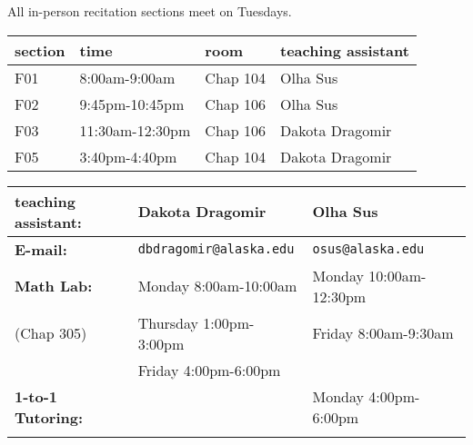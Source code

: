 \documentclass[11pt,fleqn]{article}
\begin{document}
All in-person recitation sections meet on Tuesdays.\\

\begin{center}
\vfill

\begin{tabular}{| l | l | l | l |}
\hline
section & time & room& teaching assistant \\
\hline \hline
F01&8:00am-9:00am&Chap 104& Olha Sus\\ \hline
F02&9:45pm-10:45pm&Chap 106& Olha Sus \\ \hline
F03&11:30am-12:30pm&Chap 106& Dakota Dragomir\\ \hline
F05&3:40pm-4:40pm&Chap 104& Dakota Dragomir\\ \hline
\end{tabular}
\vfill
\begin{tabular}{| l || l | l |}
\hline
\textbf{teaching assistant:}&Dakota Dragomir&Olha Sus\\
\hline \hline
\textbf{E-mail:}&\texttt{dbdragomir@alaska.edu} & \texttt{osus@alaska.edu} \\
\hline
\textbf{Math Lab:}&Monday 8:00am-10:00am & Monday 10:00am-12:30pm\\
(Chap 305)&Thursday 1:00pm-3:00pm  &Friday 8:00am-9:30am \\
&Friday 4:00pm-6:00pm&\\
\hline
\textbf{1-to-1 Tutoring:}& &Monday 4:00pm-6:00pm  \\
&&\\
\hline
\end{tabular}
\end{center}
\vfill
\end{document}
